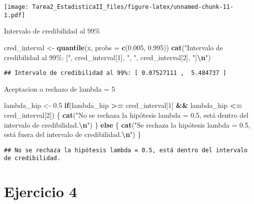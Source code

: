 \documentclass[
]{article}
\newenvironment{Shaded}{\begin{snugshade}}{\end{snugshade}}
\newcommand{\AttributeTok}[1]{\textcolor[rgb]{0.13,0.29,0.53}{#1}}
\newcommand{\ControlFlowTok}[1]{\textcolor[rgb]{0.13,0.29,0.53}{\textbf{#1}}}
\newcommand{\DecValTok}[1]{\textcolor[rgb]{0.00,0.00,0.81}{#1}}
\newcommand{\FloatTok}[1]{\textcolor[rgb]{0.00,0.00,0.81}{#1}}
\newcommand{\FunctionTok}[1]{\textcolor[rgb]{0.13,0.29,0.53}{\textbf{#1}}}
\newcommand{\NormalTok}[1]{#1}
\newcommand{\OtherTok}[1]{\textcolor[rgb]{0.56,0.35,0.01}{#1}}
\newcommand{\SpecialCharTok}[1]{\textcolor[rgb]{0.81,0.36,0.00}{\textbf{#1}}}
\newcommand{\StringTok}[1]{\textcolor[rgb]{0.31,0.60,0.02}{#1}}
\begin{document}
\texttt{[image: Tarea2\_EstadisticaII\_files/figure-latex/unnamed-chunk-11-1.pdf]}

Intervalo de credibilidad al 99\%

\begin{Shaded}
\begin{Highlighting}[]
\NormalTok{cred\_interval }\OtherTok{\textless{}{-}} \FunctionTok{quantile}\NormalTok{(x, }\AttributeTok{probs =} \FunctionTok{c}\NormalTok{(}\FloatTok{0.005}\NormalTok{, }\FloatTok{0.995}\NormalTok{))}
\FunctionTok{cat}\NormalTok{(}\StringTok{"Intervalo de credibilidad al 99\%: ["}\NormalTok{, cred\_interval[}\DecValTok{1}\NormalTok{], }\StringTok{", "}\NormalTok{, cred\_interval[}\DecValTok{2}\NormalTok{], }\StringTok{"]}\SpecialCharTok{\textbackslash{}n}\StringTok{"}\NormalTok{)}
\end{Highlighting}
\end{Shaded}

\begin{verbatim}
## Intervalo de credibilidad al 99%: [ 0.07527111 ,  5.484737 ]
\end{verbatim}

Aceptacion o rechazo de lambda = 5

\begin{Shaded}
\begin{Highlighting}[]
\NormalTok{lambda\_hip }\OtherTok{\textless{}{-}} \FloatTok{0.5}
\ControlFlowTok{if}\NormalTok{(lambda\_hip }\SpecialCharTok{\textgreater{}=}\NormalTok{ cred\_interval[}\DecValTok{1}\NormalTok{] }\SpecialCharTok{\&\&}\NormalTok{ lambda\_hip }\SpecialCharTok{\textless{}=}\NormalTok{ cred\_interval[}\DecValTok{2}\NormalTok{]) \{}
  \FunctionTok{cat}\NormalTok{(}\StringTok{"No se rechaza la hipótesis lambda = 0.5, está dentro del intervalo de credibilidad.}\SpecialCharTok{\textbackslash{}n}\StringTok{"}\NormalTok{)}
\NormalTok{\} }\ControlFlowTok{else}\NormalTok{ \{}
  \FunctionTok{cat}\NormalTok{(}\StringTok{"Se rechaza la hipótesis lambda = 0.5, está fuera del intervalo de credibilidad.}\SpecialCharTok{\textbackslash{}n}\StringTok{"}\NormalTok{)}
\NormalTok{\}}
\end{Highlighting}
\end{Shaded}

\begin{verbatim}
## No se rechaza la hipótesis lambda = 0.5, está dentro del intervalo de credibilidad.
\end{verbatim}

\section{Ejercicio 4}\label{ejercicio-4}
\end{document}
